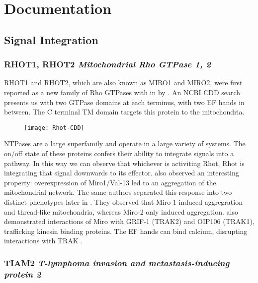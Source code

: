 \section{Documentation}

\subsection{Signal Integration}

\subsubsection{RHOT1, RHOT2 \textit{Mitochondrial Rho GTPase 1, 2}}

RHOT1 and RHOT2, which are also known as MIRO1 and MIRO2, were first reported as
a new family of Rho GTPases with in \citeyear{Fransson2003} by
\citeauthor{Fransson2003}. An NCBI CDD search presents us with two GTPase
domains at each terminus, with two EF hands in between. The C terminal TM domain
targets this protein to the mitochondria.

\begin{figure}[h]
  \texttt{[image: Rhot-CDD]}
\end{figure}

NTPases are a large superfamily and operate in a large variety of systems. The
on/off state of these proteins confers their ability to integrate signals into a
pathway. In this way we can observe that whichever is activiting Rhot, Rhot is
integrating that signal downwards to its effector. \citeauthor{Fransson2003}
also observed an interesting property: overexpression of Miro1/Val-13 led to
an aggregation of the mitochondrial network. The same authors separated this
response into two distinct phenotypes later in \citeyear{Fransson2006}. They
observed that Miro-1 induced aggregration and thread-like mitochondria, whereas
Miro-2 only induced aggregation. \citeauthor{Fransson2006} also demonstrated
interactions of Miro with GRIF-1 (TRAK2) and OIP106 (TRAK1), trafficking
kinesin binding proteins. The EF hands can bind calcium,
disrupting interactions with TRAK \citep{Reis2009}.


\subsubsection{TIAM2 \textit{T-lymphoma invasion and metastasis-inducing protein 2}}

